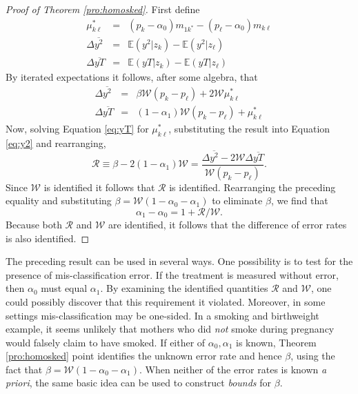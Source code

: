 \begin{proof}[Proof of Theorem \ref{pro:homosked}]
  First define
  \begin{eqnarray}
    \label{eq:mustar}
    \mu_{k\ell}^* &=&  (p_k - \alpha_0) m_{1k^*} - (p_{\ell}-\alpha_0)m_{k\ell} \\
    \label{eq:y2def}
    \Delta\overline{y^2} &=&  \mathbb{E}(y^2|z_k) - \mathbb{E}(y^2|z_\ell)\\
    \label{eq:yTdef}
    \Delta\overline{yT} &=&  \mathbb{E}(yT|z_k) - \mathbb{E}(yT|z_\ell)
  \end{eqnarray}
  By iterated expectations it follows, after some algebra, that
  \begin{eqnarray}
    \label{eq:y2}
    \Delta\overline{y^2} &=& \beta \mathcal{W} (p_k - p_\ell)  + 2 \mathcal{W} \mu_{k\ell}^* \\
    \label{eq:yT}
    \Delta\overline{yT} &=& (1-\alpha_1)\mathcal{W}(p_k - p_\ell) + \mu_{k\ell}^* 
  \end{eqnarray}
  Now, solving Equation \ref{eq:yT} for $\mu_{k\ell}^*$, substituting the result into Equation \ref{eq:y2} and rearranging,
  \begin{equation}
    \mathcal{R} \equiv \beta - 2(1-\alpha_1)\mathcal{W} = \frac{\Delta\overline{y^2} - 2 \mathcal{W}\Delta\overline{yT}}{\mathcal{W}(p_k - p_\ell)}.
    \label{eq:Rdef}
  \end{equation}
  Since $\mathcal{W}$ is identified it follows that $\mathcal{R}$ is identified.
  Rearranging the preceding equality and substituting $\beta=\mathcal{W}(1-\alpha_0 -\alpha_1)$ to eliminate $\beta$, we find that
  \begin{equation}
    \alpha_1 - \alpha_0 = 1 + \mathcal{R}/\mathcal{W}.
   \label{eq:aDiff}
  \end{equation}
  Because both $\mathcal{R}$ and $\mathcal{W}$ are identified, it follows that the difference of error rates is also identified.
\end{proof}

The preceding result can be used in several ways.
One possibility is to test for the presence of mis-classification error.
If the treatment is measured without error, then $\alpha_0$ must equal $\alpha_1$.
By examining the identified quantities $\mathcal{R}$ and $\mathcal{W}$, one could possibly discover that this requirement it violated.
Moreover, in some settings mis-classification may be one-sided.
In a smoking and birthweight example, it seems unlikely that mothers who did \emph{not} smoke during pregnancy would falsely claim to have smoked.
If either of $\alpha_0, \alpha_1$ is known, Theorem \ref{pro:homosked} point identifies the unknown error rate and hence $\beta$, using the fact that $\beta=\mathcal{W}(1-\alpha_0-\alpha_1)$.
When neither of the error rates is known \emph{a priori}, the same basic idea can be used to construct \emph{bounds} for $\beta$.

